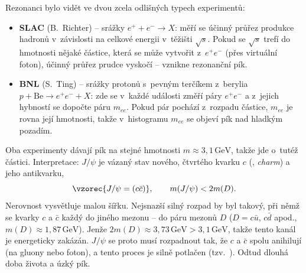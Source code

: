 Rezonanci bylo vidět ve dvou zcela odlišných typech experimentů:
\begin{itemize}
  \item \textbf{SLAC} (B.~Richter) -- srážky $e^+ + e^- \to X$: měří se účinný průřez produkce hadronů v~závislosti na celkové energii v~těžišti $\sqrt{s}$. Pokud se $\sqrt{s}$ trefí do hmotnosti nějaké částice, která se může vytvořit z~$e^+e^-$ (přes virtuální foton), účinný průřez prudce vyskočí -- vznikne rezonanční pík.
  \item \textbf{BNL} (S.~Ting) -- srážky protonů s~pevným terčíkem z~berylia $p + \mathrm{Be} \to e^+ e^- + X$: zde se v~každé události změří páry $e^+e^-$ a z~jejich hybností se dopočte  páru $m_{ee}$. Pokud pár pochází z~rozpadu částice, $m_{ee}$ je rovna její hmotnosti, takže v~histogramu $m_{ee}$ se objeví pík nad hladkým pozadím.
\end{itemize}

\begin{center}
\end{center}

Oba experimenty dávají pík na stejné hmotnosti $m\approx3{,}1\,\mathrm{GeV}$, takže jde o~tutéž částici. Interpretace: $J/\psi$ je vázaný stav nového, čtvrtého kvarku $c$ (, \emph{charm}) a jeho antikvarku,
\begin{equation}
  \vzorec{J/\psi = (c\bar c)}, \qquad m(J/\psi) < 2m(D).
\end{equation}
Nerovnost vysvětluje malou šířku. Nejsnazší silný rozpad by byl takový, při němž se kvarky $c$ a $\bar c$  každý do jiného mezonu -- do páru mezonů $D$ ($D = c\bar u$, $c\bar d$ apod., $m(D)\approx 1{,}87\,\mathrm{GeV}$). Jenže $2m(D)\approx 3{,}73\,\mathrm{GeV} > 3{,}1\,\mathrm{GeV}$, takže tento kanál je energeticky zakázán. $J/\psi$ se proto musí rozpadnout tak, že $c$ a $\bar c$ spolu anihilují (na gluony nebo foton), a tento proces je silně potlačen (tzv.\ ). Odtud dlouhá doba života a úzký pík.

